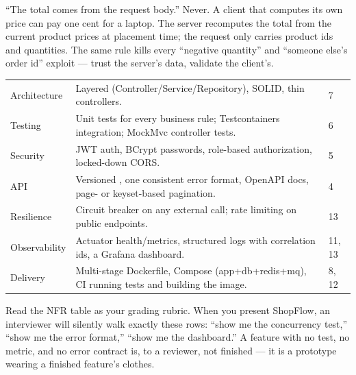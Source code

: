 \begin{misconception}
``The total comes from the request body.'' Never. A client that computes its own price can pay one cent for a laptop. The server recomputes the total from the current product prices at placement time; the request only carries product ids and quantities. The same rule kills every ``negative quantity'' and ``someone else's order id'' exploit --- trust the server's data, validate the client's.
\end{misconception}


\begin{center}\small
\begin{tabularx}{\linewidth}{@{}L{24mm} X C{9mm}@{}}
 &  & \\\midrule
Architecture & Layered (Controller/Service/Repository), SOLID, thin controllers. & 7\\
Testing & Unit tests for every business rule; Testcontainers integration; MockMvc controller tests. & 6\\
Security & JWT auth, BCrypt passwords, role-based authorization, locked-down CORS. & 5\\
API & Versioned , one consistent error format, OpenAPI docs, page- or keyset-based pagination. & 4\\
Resilience & Circuit breaker on any external call; rate limiting on public endpoints. & 13\\
Observability & Actuator health/metrics, structured logs with correlation ids, a Grafana dashboard. & 11, 13\\
Delivery & Multi-stage Dockerfile, Compose (app+db+redis+mq), CI running tests and building the image. & 8, 12\\
\end{tabularx}\end{center}

\begin{seniornote}
Read the NFR table as your grading rubric. When you present ShopFlow, an interviewer will silently walk exactly these rows: ``show me the concurrency test,'' ``show me the error format,'' ``show me the dashboard.'' A feature with no test, no metric, and no error contract is, to a reviewer, not finished --- it is a prototype wearing a finished feature's clothes.
\end{seniornote}


